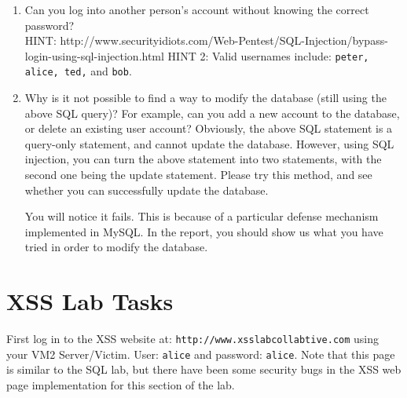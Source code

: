 \documentclass{article}
\begin{document}
\begin{enumerate}
\item Can you log into another person's account without knowing the 
      correct password?\\
  HINT:
http://www.securityidiots.com/Web-Pentest/SQL-Injection/bypass-login-using-sql-injection.html
HINT 2: Valid usernames include: {\tt peter, alice, ted,} and {\tt bob}.


\item Why is it not possible to find a way to modify the database (still using the above SQL
query)?  For example, can you add a new account to the database, or delete an 
existing user account? Obviously, the above SQL statement is a query-only
statement, and cannot update the database. However, using SQL injection,
you can turn the above statement into two statements, with the second one
being the update statement. Please try this method, and see whether you can
successfully update the database.

You will notice it fails.  
This is because of
a particular defense mechanism implemented in MySQL. In the report, you should show us what you
have tried in order to modify the database. \\

\end{enumerate}

\section{XSS Lab Tasks}
First log in to the XSS website at: {\tt http://www.xsslabcollabtive.com} using your VM2 Server/Victim. User: {\tt alice} and password: {\tt alice}. Note that this page is similar to the SQL lab, but there have been some security bugs in the XSS web page implementation for this section of the lab.
\end{document}
